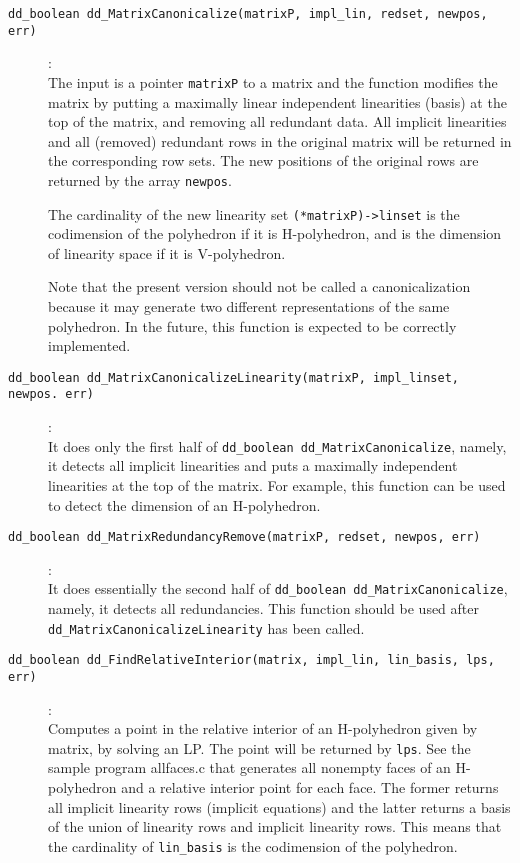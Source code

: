 \documentclass[11pt]{article}
\newcommand {\0} {{\bf 0}}
\begin{document}
\begin{description}
\item[{\tt dd\_boolean dd\_MatrixCanonicalize(matrixP, impl\_lin, redset, newpos, err)}]:\\
 The input is a pointer {\tt matrixP} to a matrix and the function
modifies the matrix by putting a maximally linear independent linearities (basis)
at the top of the matrix, and removing all redundant data.
All implicit linearities and all (removed) redundant rows
in the original matrix will be returned in the corresponding row sets.
The new positions of the original rows are returned by 
the array {\tt newpos}.

The cardinality of the new linearity set {\tt  (*matrixP)->linset} is the codimension
of the polyhedron if it is H-polyhedron, and is the dimension of linearity space
if it is V-polyhedron.

Note that the present version should not be called a canonicalization
because it may generate two different representations of the same
polyhedron.  In the future, this function is expected to be correctly
implemented. 

\item[{\tt dd\_boolean dd\_MatrixCanonicalizeLinearity(matrixP, impl\_linset, newpos. err)}]:\\
It does only the first half of {\tt dd\_boolean dd\_MatrixCanonicalize}, namely, it detects all
implicit linearities and puts a maximally independent linearities
at the top of the matrix.  For example, this function can be 
used to detect the dimension of an H-polyhedron.

\item[{\tt dd\_boolean dd\_MatrixRedundancyRemove(matrixP, redset, newpos, err)}]:\\
It does essentially the second half of {\tt dd\_boolean dd\_MatrixCanonicalize}, 
namely, it detects all
redundancies.  This function should be used after {\tt dd\_MatrixCanonicalizeLinearity}
has been called.


\item[{\tt dd\_boolean dd\_FindRelativeInterior(matrix, impl\_lin, lin\_basis, lps, err)}]:\\
Computes a point in the relative interior of an H-polyhedron given by matrix, by solving
an LP. The point will be returned by {\tt lps}.
See the sample program allfaces.c that generates all nonempty faces of an H-polyhedron and
a relative interior point for each face.   The former returns all implicit linearity rows (implicit equations)
and the latter returns a basis of the union of linearity rows and implicit linearity rows.
This means that the cardinality of {\tt *lin\_basis} is the codimension of the polyhedron.



\end{description}
\end{document}
